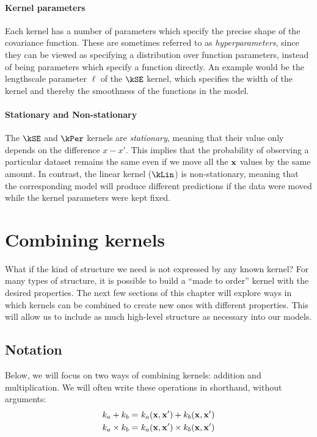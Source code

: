 \paragraph{Kernel parameters}
Each kernel has a number of parameters which specify the precise shape of the covariance function.
These are sometimes referred to as \emph{hyperparameters}, since they can be viewed as specifying a distribution over function parameters, instead of being parameters which specify a function directly.
An example would be the lengthscale parameter $\ell$ of the $\kSE$ kernel, which specifies the width of the kernel and thereby the smoothness of the functions in the model. 


\paragraph{Stationary and Non-stationary}
The $\kSE$ and $\kPer$ kernels are \emph{stationary}, meaning that their value only depends on the difference $x-x'$.  This implies that the probability of observing a particular dataset remains the same even if we move all the ${\bf{x}}$ values by the same amount.
In contrast, the linear kernel ($\kLin$) is non-stationary, meaning that the corresponding \gp{} model will produce different predictions if the data were moved while the kernel parameters were kept fixed.




\section{Combining kernels}

What if the kind of structure we need is not expressed by any known kernel?
For many types of structure, it is possible to build a ``made to order'' kernel with the desired properties.
The next few sections of this chapter will explore ways in which kernels can be combined to create new ones with different properties.
This will allow us to include as much high-level structure as necessary into our models.


\subsection{Notation}

Below, we will focus on two ways of combining kernels: addition and multiplication.
We will often write these operations in shorthand, without arguments:
%
\begin{align}
k_a + k_b =& \,\, k_a({\bf{x}}, {\bf{x}}') + k_b( {\bf{x}}, {\bf{x}}')\\
k_a \times k_b =& \,\, k_a({\bf{x}}, {\bf{x}}') \times k_b({\bf{x}}, {\bf{x}}')
\end{align}

